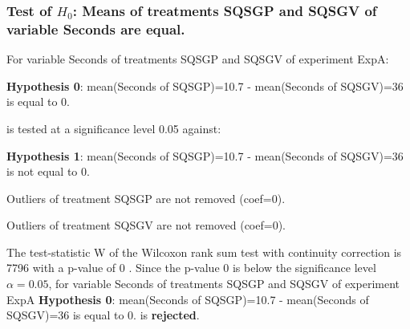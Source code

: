 \begin{frame}[t]
 \frametitle{Test of $H_{0}$: Means of treatments SQSGP and SQSGV of variable Seconds are equal. }
 \scriptsize
 For variable Seconds of treatments SQSGP and SQSGV of experiment ExpA:

\vspace{1mm}
{\bf Hypothesis 0}: mean(Seconds of SQSGP)=10.7 - mean(Seconds of SQSGV)=36 is equal to 0.


 \begin{center} is tested at a significance level 0.05 against: \end{center}

{\bf Hypothesis 1}: mean(Seconds of SQSGP)=10.7 - mean(Seconds of SQSGV)=36 is not equal to 0.
\vspace{1mm}
\vspace{1mm}

 Outliers of treatment SQSGP  are not removed (coef=0).

 Outliers of treatment SQSGV  are not removed (coef=0).
\vspace{1mm}
 
 The test-statistic W of the Wilcoxon rank sum test with continuity correction is 7796 with a p-value of 0 .
 Since the p-value 0 is below the significance level $\alpha= 0.05 $,
 for variable Seconds of treatments SQSGP and SQSGV of experiment ExpA 
 {\bf Hypothesis 0}: mean(Seconds of SQSGP)=10.7 - mean(Seconds of SQSGV)=36 is equal to 0.
is {\bf rejected}.

 \end{frame}
